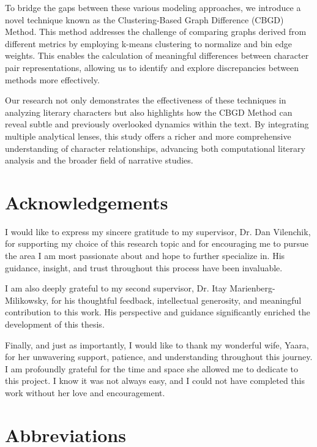 \documentclass[a4paper,12pt]{report}
\begin{document}
To bridge the gaps between these various modeling approaches, we introduce a novel technique known as the Clustering-Based Graph Difference (CBGD) Method. This method addresses the challenge of comparing graphs derived from different metrics by employing k-means clustering to normalize and bin edge weights. This enables the calculation of meaningful differences between character pair representations, allowing us to identify and explore discrepancies between methods more effectively.

Our research not only demonstrates the effectiveness of these techniques in analyzing literary characters but also highlights how the CBGD Method can reveal subtle and previously overlooked dynamics within the text. By integrating multiple analytical lenses, this study offers a richer and more comprehensive understanding of character relationships, advancing both computational literary analysis and the broader field of narrative studies.

    \chapter*{Acknowledgements}
   I would like to express my sincere gratitude to my supervisor, Dr. Dan Vilenchik, for supporting my choice of this research topic and for encouraging me to pursue the area I am most passionate about and hope to further specialize in. His guidance, insight, and trust throughout this process have been invaluable.

I am also deeply grateful to my second supervisor, Dr. Itay Marienberg-Milikowsky, for his thoughtful feedback, intellectual generosity, and meaningful contribution to this work. His perspective and guidance significantly enriched the development of this thesis.

Finally, and just as importantly, I would like to thank my wonderful wife, Yaara, for her unwavering support, patience, and understanding throughout this journey. I am profoundly grateful for the time and space she allowed me to dedicate to this project. I know it was not always easy, and I could not have completed this work without her love and encouragement.\\
    
	\newpage
	\tableofcontents
	\newpage
	\listoffigures
	\newpage



\newpage
\chapter*{Abbreviations}
\end{document}
